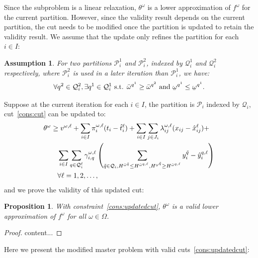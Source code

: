 \documentclass[11pt]{article}
\newtheorem{proposition}[theorem]{Proposition}
\newtheorem{assumption}{Assumption}
\newcommand{\noi}{\noindent}
\renewcommand{\underbar}{\underaccent{\bar}}
\begin{document}
	Since the subproblem is a linear relaxation, \(\theta^\omega\) is a lower approximation of \(f^\omega\) for the current partition. However, since the validity result depends on the current partition, the cut needs to be modified once the partition is updated to retain the validity result. We assume that the update only refines the partition for each \(i \in I\):
	\begin{assumption}
		For two partitions \(\mathcal{P}^1_i\) and \(\mathcal{P}^2_i\), indexed by \(\mathcal{Q}^1_i\) and \(\mathcal{Q}^2_i\) respectively, where \(\mathcal{P}^2_i\) is used in a later iteration than \(\mathcal{P}^1_i\), we have:
		\begin{equation*}
		\forall q^2 \in \mathcal{Q}^2_i, \exists q^1 \in \mathcal{Q}^1_i \text{ s.t. } \bar{\omega}^{q^1} \geq \bar{\omega}^{q^2} \text{ and } \underbar{\omega}^{q^1} \leq \underbar{\omega}^{q^1}.
		\end{equation*}
	\end{assumption}
	\noi Suppose at the current iteration for each \(i \in I\), the partition is \(\mathcal{P}_i\) indexed by \(\mathcal{Q}_i\), cut~\eqref{cons:cut} can be updated to:
	\begin{align} \label{cons:updatedcut}
		& \theta^\omega \geq v^{\omega,\ell} + \sum_{i \in I} \pi_i^{\omega,\ell} (t_i - \hat{t}_i^{\ell}) + \sum_{i \in I} \sum_{j \in J_i} \lambda_{ij}^{\omega,\ell} (x_{ij} - \hat{x}_{ij}^{\ell}) + \nonumber \\
		& \qquad \sum_{i \in I} \sum_{q \in \mathcal{Q}^{\ell}_i} \gamma_{i,q}^{\omega,\ell} \left( \sum_{\tilde{q} \in \mathcal{Q}_i, H^{\bar{\omega}^{\tilde{q}}} \leq H^{\bar{\omega}^{q,\ell}},H^{\underbar{\omega}^{\tilde{q}}} \geq H^{\bar{\omega}^{q,\ell}} }y_i^{\tilde{q}} - \hat{y}_i^{q,\ell} \right) \nonumber\\
		& \qquad \forall \ell = 1,2, \dots,
	\end{align}
	and we prove the validity of this updated cut:
	\begin{proposition}
		With constraint~\eqref{cons:updatedcut}, \(\theta^\omega\) is a valid lower approximation of \(f^\omega\) for all \(\omega \in \Omega\).
	\end{proposition}
	\begin{proof}
		content...
	\end{proof}
	\noi Here we present the modified master problem with valid cuts~\eqref{cons:updatedcut}:
\end{document}
